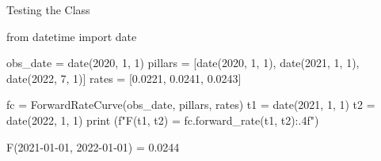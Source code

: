 \documentclass{beamer}
\begin{document}
\begin{frame}[fragile]{Testing the Class}
\begin{ipython}
from datetime import date

obs_date = date(2020, 1, 1)
pillars = [date(2020, 1, 1),
           date(2021, 1, 1),
           date(2022, 7, 1)]
rates = [0.0221, 0.0241, 0.0243]

fc = ForwardRateCurve(obs_date, pillars, rates)
t1 = date(2021, 1, 1)
t2 = date(2022, 1, 1)
print (f"F({t1}, {t2}) = {fc.forward_rate(t1, t2):.4f}")
\end{ipython}
\begin{ioutput}
F(2021-01-01, 2022-01-01) = 0.0244
\end{ioutput}
\end{frame}
\end{document}

